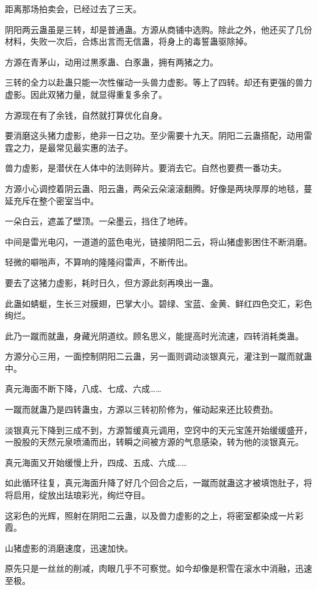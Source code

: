 \begin{this_body}
距离那场拍卖会，已经过去了三天。

阴阳两云蛊虽是三转，却是普通蛊。方源从商铺中选购。除此之外，他还买了几份材料，失败一次后，合炼出言而无信蛊，将身上的毒誓蛊驱除掉。

方源在青茅山，动用过黒豕蛊、白豕蛊，拥有两猪之力。

三转的全力以赴蛊只能一次性催动一头兽力虚影。等上了四转。却还有更强的兽力虚影。因此双猪力量，就显得重复多余了。

方源现在有了余钱，自然就打算优化自身。

要消磨这头猪力虚影，绝非一日之功。至少需要十九天。阴阳二云蛊搭配，动用雷霆之力，是最常见最实惠的法子。

兽力虚影，是潜伏在人体中的法则碎片。要消去它。自然也要费一番功夫。

方源小心调控着阴云蛊、阳云蛊，两朵云朵滚滚翻腾。好像是两块厚厚的地毯，蔓延充斥在整个密室当中。

一朵白云，遮盖了壁顶。一朵墨云，挡住了地砖。

中间是雷光电闪，一道道的蓝色电光，链接阴阳二云，将山猪虚影困住不断消磨。

轻微的噼啪声，不算响的隆隆闷雷声，不断传出。

要去了这猪力虚影，耗时日久，但方源此刻再唤出一蛊。

此蛊如蜻蜓，生长三对膜翅，巴掌大小。碧绿、宝蓝、金黄、鲜红四色交汇，彩色绚烂。

此乃一蹴而就蛊，身藏光阴道纹。顾名思义，能提高时光流速，四转消耗类蛊。

方源分心三用，一面控制阴阳二云蛊，另一面则调动淡银真元，灌注到一蹴而就蛊中。

真元海面不断下降，八成、七成、六成……

一蹴而就蛊乃是四转蛊虫，方源以三转初阶修为，催动起来还比较费劲。

淡银真元下降到三成不到，方源暂缓真元调用，空窍中的天元宝莲开始缓缓盛开，一股股的天然元泉喷涌而出，转瞬之间被方源的气息感染，转为他的淡银真元。

真元海面又开始缓慢上升，四成、五成、六成……

如此循环往复，真元海面升降了好几个回合之后，一蹴而就蛊这才被填饱肚子，将将启用，绽放出珐琅彩光，绚烂夺目。

这彩色的光辉，照射在阴阳二云蛊，以及兽力虚影的之上，将密室都染成一片彩霞。

山猪虚影的消磨速度，迅速加快。

原先只是一丝丝的削减，肉眼几乎不可察觉。如今却像是积雪在滚水中消融，迅速至极。


\end{this_body}
